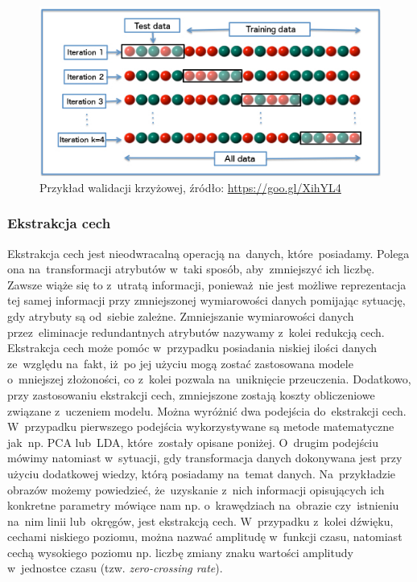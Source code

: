 \begin{figure}[ht!]
\centering
\includegraphics[scale=0.7]{res/cv.jpg}
\caption[Caption for LOF]{Przykład walidacji krzyżowej, źródło: \url{https://goo.gl/XihYL4}} \label{cv} 
\end{figure}


\subsubsection{Ekstrakcja cech}
Ekstrakcja cech jest nieodwracalną operacją na~danych, które~posiadamy. Polega ona na~transformacji atrybutów w~taki sposób, aby~zmniejszyć ich liczbę. Zawsze wiąże się to z~utratą informacji, ponieważ~nie jest możliwe reprezentacja tej samej informacji przy zmniejszonej wymiarowości danych pomijając sytuację, gdy atrybuty są od~siebie zależne. Zmniejszanie wymiarowości danych przez~eliminacje redundantnych atrybutów nazywamy z~kolei redukcją cech.  Ekstrakcja cech może pomóc w~przypadku posiadania niskiej ilości danych ze~względu na~fakt, iż~po jej użyciu mogą zostać zastosowana modele o~mniejszej złożoności, co z~kolei pozwala na~uniknięcie przeuczenia. Dodatkowo, przy zastosowaniu ekstrakcji cech, zmniejszone zostają koszty obliczeniowe związane z~uczeniem modelu. Można wyróżnić dwa podejścia do~ekstrakcji cech. W~przypadku pierwszego podejścia wykorzystywane są metode matematyczne jak~np. PCA lub~LDA, które~zostały opisane poniżej. O~drugim podejściu mówimy natomiast w~sytuacji, gdy transformacja danych dokonywana jest przy użyciu dodatkowej wiedzy, którą posiadamy na~temat danych. Na~przykładzie obrazów możemy powiedzieć, że~uzyskanie z~nich informacji opisujących ich konkretne parametry mówiące nam np. o~krawędziach na~obrazie czy~istnieniu na~nim linii lub~okręgów, jest ekstrakcją cech. W~przypadku z~kolei dźwięku, cechami niskiego poziomu, można nazwać amplitudę w~funkcji czasu, natomiast cechą wysokiego poziomu np. liczbę zmiany znaku wartości amplitudy w~jednostce czasu (tzw. \textit{zero-crossing rate}).
